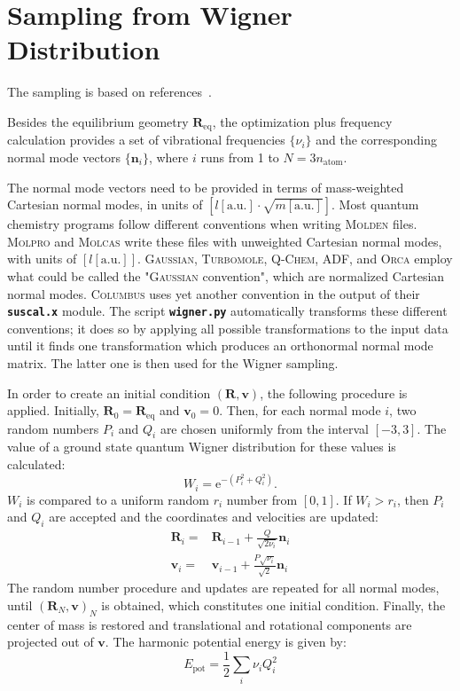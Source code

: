 \documentclass[a4paper,10pt,DIV=15,openany,twoside=false]{scrbook}
\newcommand{\ttt}[1]{\textbf{\texttt{#1}}}
\newcommand{\E}{\ensuremath{\mathrm{e}}}
\newcommand{\VEC}[1]{\ensuremath{\mathbf{#1}}}
\begin{document}
\section{Sampling from Wigner Distribution}\label{met:wigner}

The sampling is based on references~\cite{Dahl1988JCP, Schinke1995}.

Besides the equilibrium geometry $\VEC{R}_{\text{eq}}$, the optimization plus frequency calculation provides a set of vibrational frequencies $\{\nu_i\}$ and the corresponding normal mode vectors $\{\VEC{n}_i\}$, where $i$ runs from 1 to $N=3n_{\text{atom}}$.

The normal mode vectors need to be provided in terms of mass-weighted Cartesian normal modes, in units of $[l[\text{a.u.}]\cdot\sqrt{m[\text{a.u.}]}]$.
Most quantum chemistry programs follow different conventions when writing \textsc{Molden} files. \textsc{Molpro} and \textsc{Molcas} write these files with unweighted Cartesian normal modes, with units of $[l[\text{a.u.}]]$. \textsc{Gaussian}, \textsc{Turbomole}, \textsc{Q-Chem}, \textsc{ADF}, and \textsc{Orca} employ what could be called the "\textsc{Gaussian} convention", which are normalized Cartesian normal modes. \textsc{Columbus} uses yet another convention in the output of their \ttt{suscal.x} module.
The script \ttt{wigner.py} automatically transforms these different conventions; it does so by applying all possible transformations to the input data until it finds one transformation which produces an orthonormal normal mode matrix.
The latter one is then used for the Wigner sampling.

In order to create an initial condition $(\VEC{R},\VEC{v})$, the following procedure is applied. Initially, $\VEC{R}_0=\VEC{R}_{\text{eq}}$ and $\VEC{v}_0=0$. Then, for each normal mode $i$, two random numbers $P_i$ and $Q_i$ are chosen uniformly from the interval $[-3,3]$. The value of a ground state quantum Wigner distribution for these values is calculated:
\begin{equation}
  W_i=\E^{-(P_i^2+Q_i^2)}.
\end{equation}
$W_i$ is compared to a uniform random $r_i$ number from $[0,1]$. If $W_i>r_i$, then $P_i$ and $Q_i$ are accepted and the coordinates and velocities are updated:
\begin{align}
  \VEC{R}_i=&\VEC{R}_{i-1} + \frac{Q}{\sqrt{2\nu_i}}\VEC{n}_i           \label{eq:wigner1}\\
  \VEC{v}_i=&\VEC{v}_{i-1} + \frac{P\sqrt{\nu_i}}{\sqrt{2}}\VEC{n}_i    \label{eq:wigner2}
\end{align}
The random number procedure and updates are repeated for all normal modes, until $(\VEC{R}_N,\VEC{v})_N$ is obtained, which constitutes one initial condition. Finally, the center of mass is restored and translational and rotational components are projected out of $\VEC{v}$. The harmonic potential energy is given by:
\begin{equation}
  E_{\text{pot}}=\frac{1}{2}\sum\limits_i \nu_iQ_i^2
\end{equation}
\end{document}
